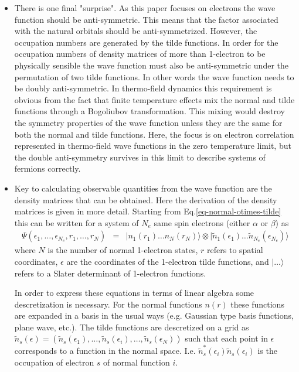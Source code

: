 \documentclass[aip,graphicx]{revtex4-1}
\begin{document}
\begin{itemize}
    \item There is one final "surprise". As this paper focuses on electrons the wave function should be anti-symmetric. This means that the factor associated with the natural orbitals should be anti-symmetrized. However, the occupation numbers are generated by the tilde functions. In order for the occupation numbers of density matrices of more than 1-electron to be physically sensible the wave function must also be anti-symmetric under the permutation of two tilde functions. In other words the wave function needs to be doubly anti-symmetric. In thermo-field dynamics this requirement is obvious from the fact that finite temperature effects mix the normal and tilde functions through a Bogoliubov transformation\cite{Bogoljubov_1958}. This mixing would destroy the symmetry properties of the wave function unless they are the same for both the normal and tilde functions. Here, the focus is on electron correlation represented in thermo-field wave functions in the zero temperature limit, but the double anti-symmetry survives in this limit to describe systems of fermions correctly.
    
    \item Key to calculating observable quantities from the wave function are the density matrices that can be obtained. Here the derivation of the density matrices is given in more detail. Starting from Eq.\ref{eq-normal-otimes-tilde} this can be written for a system of $N_e$ same spin electrons (either $\alpha$ or $\beta$) as
    \begin{eqnarray}
    \Psi(\epsilon_1,\ldots,\epsilon_{N_e},r_1,\ldots,r_N) 
    &=& |n_1(r_1)\ldots n_N(r_N)\rangle \otimes |\tilde{n}_1(\epsilon_1)\ldots\tilde{n}_{N_e}(\epsilon_{N_e})\rangle 
    \end{eqnarray}
    where $N$ is the number of normal 1-electron states, $r$ refers to spatial coordinates, $\epsilon$ are the coordinates of the 1-electron tilde functions, and $|\ldots\rangle$ refers to a Slater determinant of 1-electron functions.
    
    In order to express these equations in terms of linear algebra some descretization is necessary. For the normal functions $n(r)$ these functions are expanded in a basis in the usual ways (e.g. Gaussian type basis functions, plane wave, etc.). The tilde functions are descretized on a grid as $\tilde{n}_s(\epsilon) = (\tilde{n}_s(\epsilon_1),\ldots,\tilde{n}_s(\epsilon_i),\ldots,\tilde{n}_s(\epsilon_N))$ such that each point in $\epsilon$ corresponds to a function in the normal space. I.e. $\tilde{n}_s^*(\epsilon_i)\tilde{n}_s(\epsilon_i)$ is the occupation of electron $s$ of normal function $i$.
    

\end{itemize}
\end{document}
